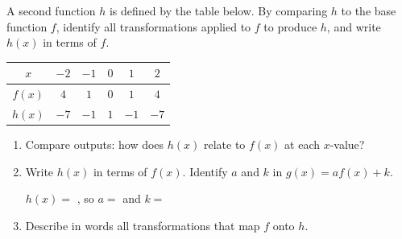 \documentclass[10pt]{article}
\begin{document}
\begin{tcolorbox}[colback=white, colframe=black!40,
    title=\textbf{Tier E --- Extend},
    fonttitle=\bfseries, arc=2mm, left=3mm, right=3mm, top=2mm, bottom=2mm]

A second function $h$ is defined by the table below. By comparing $h$ to the base function
$f$, identify all transformations applied to $f$ to produce $h$, and write $h(x)$ in terms
of $f$.

\medskip
\renewcommand{\arraystretch}{1.25}
\begin{tabular}{|c|c|c|c|c|c|}
\hline
$x$    & $-2$ & $-1$ & $0$ & $1$ & $2$ \\
\hline
$f(x)$ & $4$  & $1$  & $0$ & $1$ & $4$ \\
\hline
$h(x)$ & $-7$ & $-1$ & $1$ & $-1$ & $-7$ \\
\hline
\end{tabular}

\medskip
\begin{enumerate}[itemsep=8pt]
  \item Compare outputs: how does $h(x)$ relate to $f(x)$ at each $x$-value?

        \vspace{0.05in}

  \item Write $h(x)$ in terms of $f(x)$. Identify $a$ and $k$ in $g(x) = af(x)+k$.

        \vspace{0.05in}
        $h(x) = $ , so $a = $  and $k = $ 

  \item Describe in words all transformations that map $f$ onto $h$.

        \vspace{0.05in}
\end{enumerate}

\end{tcolorbox}
\end{document}
